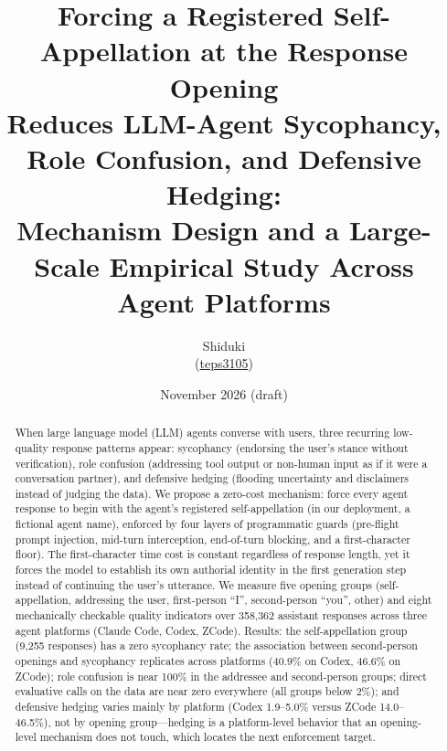\documentclass[10pt,twocolumn]{article}
\title{Forcing a Registered Self-Appellation at the Response Opening\\Reduces LLM-Agent Sycophancy, Role Confusion, and Defensive Hedging:\\Mechanism Design and a Large-Scale Empirical Study Across Agent Platforms}
\author{Shiduki\\ (\href{https://github.com/teps3105}{teps3105})}
\date{November 2026 (draft)}
\begin{document}
\maketitle

\begin{abstract}
When large language model (LLM) agents converse with users, three recurring low-quality
response patterns appear: sycophancy (endorsing the user's stance without verification),
role confusion (addressing tool output or non-human input as if it were a conversation
partner), and defensive hedging (flooding uncertainty and disclaimers instead of judging
the data). We propose a zero-cost mechanism: force every agent response to begin with the
agent's registered self-appellation (in our deployment, a fictional agent name), enforced
by four layers of programmatic guards (pre-flight prompt injection, mid-turn interception,
end-of-turn blocking, and a first-character floor). The first-character time cost is
constant regardless of response length, yet it forces the model to establish its own
authorial identity in the first generation step instead of continuing the user's
utterance. We measure five opening groups (self-appellation, addressing the user,
first-person ``I'', second-person ``you'', other) and eight mechanically checkable
quality indicators over 358{,}362 assistant responses across three agent platforms
(Claude Code, Codex, ZCode). Results: the self-appellation group (9{,}255 responses) has
a zero sycophancy rate; the association between second-person openings and sycophancy
replicates across platforms (40.9\% on Codex, 46.6\% on ZCode); role confusion is near
100\% in the addressee and second-person groups; direct evaluative calls on the data are
near zero everywhere (all groups below 2\%); and defensive hedging varies mainly by
platform (Codex 1.9--5.0\% versus ZCode 14.0--46.5\%), not by opening group---hedging is
a platform-level behavior that an opening-level mechanism does not touch, which locates
the next enforcement target.
\end{abstract}
\end{document}
